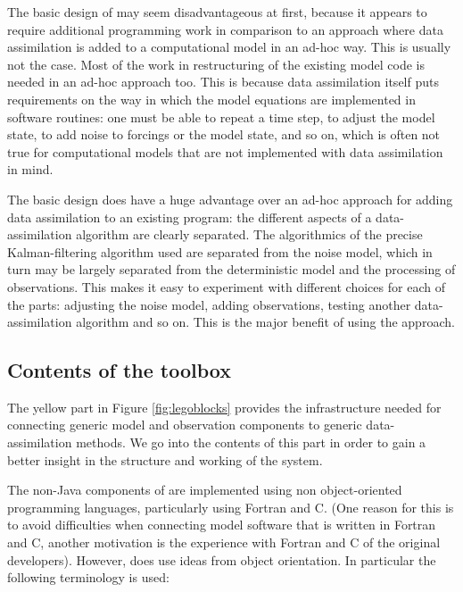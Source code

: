 The basic design of \oda may seem disadvantageous at first, because it appears to require additional programming work in comparison to an approach where data assimilation is added to a computational model in an ad-hoc way. This is usually not the case. Most of the work in restructuring of the existing model code is needed in an ad-hoc approach too. This is because data assimilation itself puts requirements on the way in which the model equations are implemented in software routines: one must be able to repeat a time step, to adjust the model state, to add noise to forcings or the model state, and so on, which is often not true for computational models that are not implemented with data assimilation in mind.

The basic design does have a huge advantage over an ad-hoc approach for adding data assimilation to an existing program: the different aspects of a data-assimilation algorithm are clearly separated. The algorithmics of the precise Kalman-filtering algorithm used are separated from the noise model, which in turn may be largely separated from the deterministic model and the processing of observations. This makes it easy to experiment with different choices for each of the parts: adjusting the noise model, adding observations, testing another data-assimilation algorithm and so on. This is the major benefit of using the \oda approach.

\subsection{Contents of the \oda toolbox}\label{sec:OO}

The yellow part in Figure \ref{fig:legoblocks} provides the infrastructure needed for connecting generic model and observation components to generic data-assimilation methods. We go into the contents of this part in order to gain a better insight in the structure and working of the \oda system.

The non-Java components of \oda are implemented using non object-oriented programming languages, particularly using Fortran and C. (One reason for this is to avoid difficulties when connecting model software that is written in Fortran and C, another motivation is the experience with Fortran and C of the original developers). However, \oda does use ideas from object orientation. In particular the following terminology is used:

